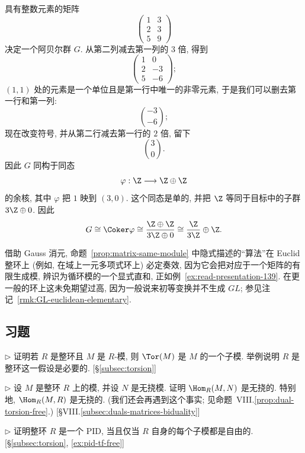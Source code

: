 \begin{example}\label{ex:read-presentation-139}
具有整数元素的矩阵
$$
\begin{pmatrix} 1 & 3 \\ 2 & 3 \\ 5 & 9 \end{pmatrix}
$$
决定一个阿贝尔群 $G$. 从第二列减去第一列的 $3$ 倍, 得到
$$
\begin{pmatrix} 1 & 0 \\ 2 & -3 \\ 5 & -6 \end{pmatrix};
$$
$(1,1)$ 处的元素是一个单位且是第一行中唯一的非零元素, 于是我们可以删去第一行和第一列:
$$
\binom{-3}{-6};
$$
现在改变符号, 并从第二行减去第一行的 $2$ 倍, 留下
$$
\binom{3}{0}.
$$
因此 $G$ 同构于同态
$$
\varphi:\Z\longrightarrow \Z\oplus\Z
$$
的余核, 其中 $\varphi$ 把 $1$ 映到 $(3,0)$. 这个同态是单的, 并把 $\Z$ 等同于目标中的子群 $3\Z\oplus 0$. 因此
$$
G\cong \Coker\varphi \cong \frac{\Z\oplus\Z}{3\Z\oplus 0} \cong \frac{\Z}{3\Z}\oplus\Z.
$$
\end{example}

借助 Gauss 消元, 命题~\ref{prop:matrix-same-module} 中隐式描述的“算法”在 Euclid 整环上 (例如, 在域上一元多项式环上) 必定奏效, 因为它会把对应于一个矩阵的有限生成模, 辨识为循环模的一个显式直和, 正如例~\ref{ex:read-presentation-139}. 在更一般的环上这未免期望过高, 因为一般说来初等变换并不生成 $GL$; 参见注记~\ref{rmk:GL-euclidean-elementary}.

\subsection*{习题}
{}

\begin{prob}\label{ex:tor-submodule}
$\triangleright$ 证明若 $R$ 是整环且 $M$ 是 $R$-模, 则 $\Tor(M)$ 是 $M$ 的一个子模. 举例说明 $R$ 是整环这一假设是必要的. [§\ref{subsec:torsion}]
\end{prob}

\begin{prob}\label{ex:hom-torsion-free}
$\triangleright$ 设 $M$ 是整环 $R$ 上的模, 并设 $N$ 是无挠模. 证明 $\Hom_R(M,N)$ 是无挠的. 特别地, $\Hom_R(M,R)$ 是无挠的. (我们还会再遇到这个事实; 见命题~VIII.\ref{prop:dual-torsion-free}.) [§VIII.\ref{subsec:duals-matrices-biduality}]
\end{prob}

\begin{prob}\label{ex:PID-submodule-free}
$\triangleright$ 证明整环 $R$ 是一个 PID, 当且仅当 $R$ 自身的每个子模都是自由的. [§\ref{subsec:torsion}, \ref{ex:pid-tf-free}]
\end{prob}


